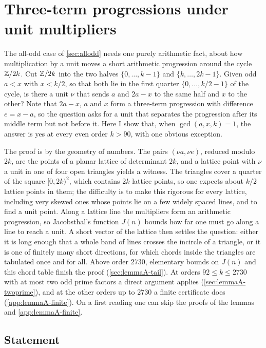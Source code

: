 \section{Three-term progressions under unit multipliers}
\label{sec:lemmaA}

The all-odd case of \autoref{sec:allodd} needs one purely arithmetic fact,
about how multiplication by a unit moves a short arithmetic progression
around the cycle $\mathbb{Z}/2k$. Cut $\mathbb{Z}/2k$ into the two halves $\{0,\dots,k-1\}$
and $\{k,\dots,2k-1\}$. Given odd $a<x$ with $x<k/2$, so that both lie in
the first quarter $\{0,\dots,k/2-1\}$ of the cycle,
is there a unit $\nu$ that sends $a$ and $2a-x$ to the same half and $x$ to
the other? Note that $2a-x$, $a$ and $x$ form a three-term progression with
difference $e=x-a$, so the question asks for a unit that separates the
progression after its middle term but not before it. Here I show that, when
$\gcd(a,x,k)=1$, the answer is yes at every even order $k>90$, with one
obvious exception.

The proof is by the geometry of numbers. The pairs $(\nu a,\nu e)$, reduced
modulo $2k$, are the points of a planar lattice of determinant $2k$, and a
lattice point with $\nu$ a unit in one of four open triangles yields a
witness. The triangles cover a quarter of the square $[0,2k)^2$, which
contains $2k$ lattice points, so one expects about $k/2$ lattice points in
them; the difficulty is to make this rigorous for every lattice, including
very skewed ones whose points lie on a few widely spaced lines, and to find a
unit point. Along a lattice line the multipliers form an arithmetic
progression, so Jacobsthal's function $J(n)$ bounds how far one must go
along a line to reach a unit. A short vector of the lattice then settles the
question: either it is long enough that a whole band of lines crosses the
incircle of a triangle, or it is one of finitely many short directions, for
which chords inside the triangles are tabulated once and for all. Above order
$2730$, elementary bounds on $J(n)$ and this chord table finish the proof
(\autoref{sec:lemmaA-tail}). At orders $92\le k\le2730$ with at most two
odd prime factors a direct argument applies (\autoref{sec:lemmaA-twoprime}),
and at the other orders up to $2730$ a finite certificate does
(\autoref{app:lemmaA-finite}). On a first reading one can skip the
proofs of the lemmas and \autoref{app:lemmaA-finite}.

\subsection{Statement}

